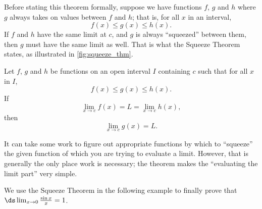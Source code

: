 Before stating this theorem formally, suppose we have functions $f$, $g$ and $h$ where $g$ always takes on values between $f$ and $h$; that is, for all $x$ in an interval, $$f(x) \leq g(x) \leq h(x).$$ If $f$ and $h$ have the same limit at $c$, and $g$  is always ``squeezed'' between them, then $g$ must have the same limit as well. That is what the Squeeze Theorem states, as illustrated in \autoref{fig:squeeze_thm}.


{Let $f$, $g$ and $h$ be functions on an open interval $I$ containing $c$ such that for all $x$ in $I$, $$f(x)\leq g(x) \leq h(x).$$ If $$\lim_{x\to c} f(x) = L = \lim_{x\to c} h(x),$$ then $$\lim_{x\to c} g(x) = L.$$ 
}

It can take some work to figure out appropriate functions by which to ``squeeze'' the given function of which you are trying to evaluate a limit. However, that is generally the only place work is necessary; the theorem makes the ``evaluating the limit part'' very simple. 

We use the Squeeze Theorem in the following example to finally prove that $\ds \lim_{x\to 0} \frac{\sin x}{x} = 1$.

